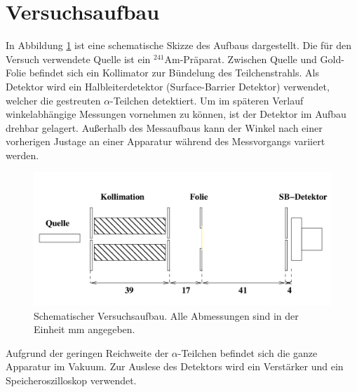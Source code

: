 \section{Versuchsaufbau}
\label{sec:Versuchaufbau}
In Abbildung \ref{aufbau} ist eine schematische Skizze des Aufbaus dargestellt. Die für
den Versuch verwendete Quelle ist ein $^{241}$Am-Präparat. Zwischen
Quelle und Gold-Folie befindet sich ein Kollimator zur Bündelung des Teilchenstrahls.
Als Detektor wird ein Halbleiterdetektor (Surface-Barrier Detektor) verwendet, welcher die gestreuten $\alpha$-Teilchen detektiert. Um im späteren Verlauf winkelabhängige Messungen vornehmen zu können, ist der Detektor im Aufbau drehbar gelagert. Außerhalb des Messaufbaus kann der Winkel nach einer vorherigen Justage an einer Apparatur während des Messvorgangs variiert werden. 
\begin{figure}
   \centering
   \includegraphics[width=1\textwidth]{ressources/aufbau.png}
   \caption{Schematischer Versuchsaufbau. Alle Abmessungen sind in der Einheit mm angegeben.\cite{skript}}
   \label{aufbau}
 \end{figure}
Aufgrund der geringen Reichweite der $\alpha$-Teilchen befindet sich die
ganze Apparatur im Vakuum. Zur Auslese des Detektors wird ein
Verstärker und ein Speicheroszilloskop verwendet.

